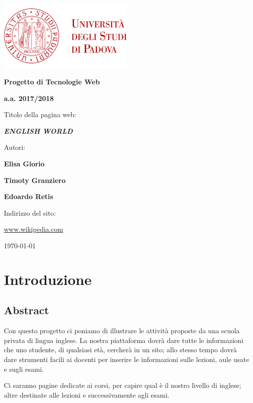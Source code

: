\documentclass[12pt, a4paper]{article}
\begin{document}
\frenchspacing
\begin{titlepage}
	\centering
	\includegraphics[width=0.50\textwidth]{img/logo_unipd_color.png}\par\vspace{1cm} %
	
	{\LARGE\bfseries Progetto di Tecnologie Web \par}
	\vspace{1cm}
	{\Large\bfseries a.a. 2017/2018 \par}
	\vspace{2cm}
	
	{\Large Titolo della pagina web: \par}
	\vspace{0.5cm}
	
	{\LARGE\bfseries\itshape ENGLISH WORLD \par}
	
	\vfill 

	Autori: \par
	{\bfseries Elisa Giorio \par}
	{\bfseries Timoty Granziero \par}
	{\bfseries Edoardo Retis \par}
	
	\vfill

	Indirizzo del sito: \par
	\url{www.wikipedia.com}
	\vfill
	
	{\large \today\par}
	
\end{titlepage}

\tableofcontents 
\pagebreak

\section{Introduzione}

\subsection{Abstract}
Con questo progetto ci poniamo di illustrare le attività proposte da una scuola privata di lingua inglese. La nostra piattaforma dovrà dare tutte le informazioni che uno studente, di qualsiasi età, cercherà in un sito; allo stesso tempo dovrà dare strumenti facili ai docenti per inserire le informazioni sulle lezioni, aule usate e sugli esami.\par
Ci saranno pagine dedicate ai corsi, per capire qual è il nostro livello di inglese; altre destinate alle lezioni e successivamente agli esami.
\end{document}
